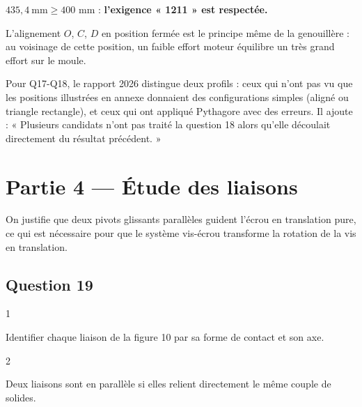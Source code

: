 \documentclass[11pt,a4paper]{article}
\renewcommand{\geq}{\geqslant}
\newcommand{\equationajustee}[1]{%
  \sbox{\boiteequation}{$\displaystyle #1$}%
  \ifdim\wd\boiteequation>\linewidth
    \[\resizebox{\linewidth}{!}{\usebox{\boiteequation}}\]%
  \else
    \[#1\]%
  \fi}
\begin{document}
\equationajustee{\boxed{\Delta x=2e+L-\sqrt{L^2-4e^2}\simeq435{,}4\ \text{mm}}}

\(435{,}4\ \text{mm}\geq400\) mm : \textbf{l'exigence « 1211 » est respectée.}

\begin{methode}

L'alignement \(O\), \(C\), \(D\) en position fermée est le principe même de la genouillère : au voisinage de cette position, un faible effort moteur équilibre un très grand effort sur le moule.

\end{methode}

\begin{jury}

Pour Q17-Q18, le rapport 2026 distingue deux profils : ceux qui n'ont pas vu que les positions illustrées en annexe donnaient des configurations simples (aligné ou triangle rectangle), et ceux qui ont appliqué Pythagore avec des erreurs. Il ajoute : « Plusieurs candidats n'ont pas traité la question 18 alors qu'elle découlait directement du résultat précédent. »

\end{jury}

\hypertarget{partie-4-uxe9tude-des-liaisons}{%
\section{Partie 4 --- Étude des liaisons}\label{partie-4-uxe9tude-des-liaisons}}

On justifie que deux pivots glissants parallèles guident l'écrou en translation pure, ce qui est nécessaire pour que le système vis-écrou transforme la rotation de la vis en translation.

\hypertarget{question-19}{%
\subsection{Question 19}\label{question-19}}

\begin{indication}{1}

Identifier chaque liaison de la figure 10 par sa forme de contact et son axe.

\end{indication}

\begin{indication}{2}

Deux liaisons sont en parallèle si elles relient directement le même couple de solides.

\end{indication}
\end{document}
